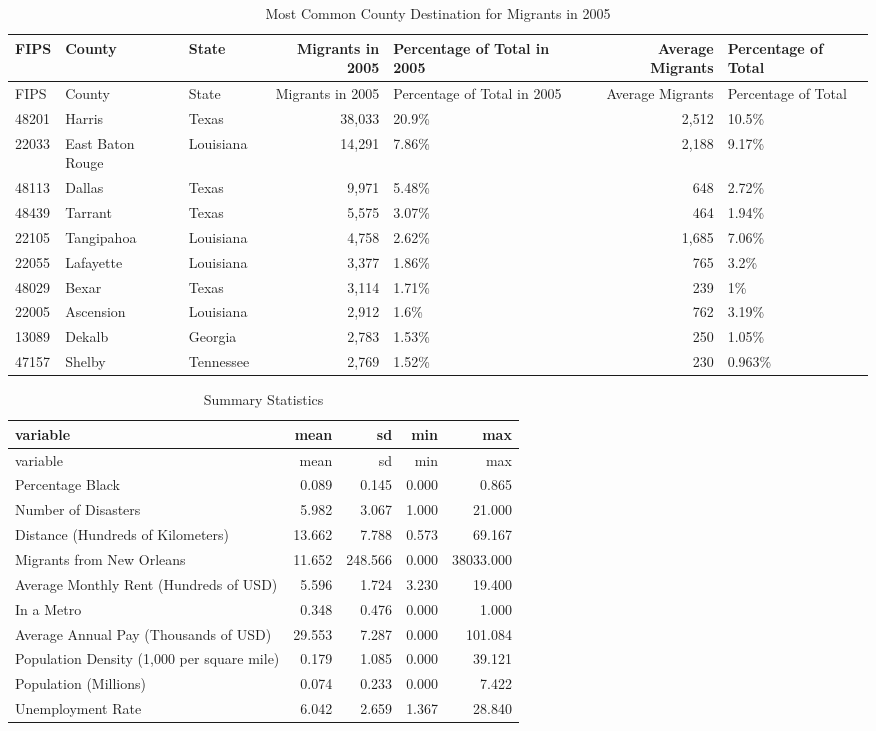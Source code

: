 \documentclass[]{article}
\begin{document}
\clearpage

\begin{longtable}[]{@{}lllrlrl@{}}
\caption{Most Common County Destination for Migrants in 2005
\label{tab:commondest}}\tabularnewline
\toprule
FIPS & County & State & Migrants in 2005 & Percentage of Total in 2005 &
Average Migrants & Percentage of Total\tabularnewline
\midrule
\endfirsthead
\toprule
FIPS & County & State & Migrants in 2005 & Percentage of Total in 2005 &
Average Migrants & Percentage of Total\tabularnewline
\midrule
\endhead
48201 & Harris & Texas & 38,033 & 20.9\% & 2,512 & 10.5\%\tabularnewline
22033 & East Baton Rouge & Louisiana & 14,291 & 7.86\% & 2,188 &
9.17\%\tabularnewline
48113 & Dallas & Texas & 9,971 & 5.48\% & 648 & 2.72\%\tabularnewline
48439 & Tarrant & Texas & 5,575 & 3.07\% & 464 & 1.94\%\tabularnewline
22105 & Tangipahoa & Louisiana & 4,758 & 2.62\% & 1,685 &
7.06\%\tabularnewline
22055 & Lafayette & Louisiana & 3,377 & 1.86\% & 765 &
3.2\%\tabularnewline
48029 & Bexar & Texas & 3,114 & 1.71\% & 239 & 1\%\tabularnewline
22005 & Ascension & Louisiana & 2,912 & 1.6\% & 762 &
3.19\%\tabularnewline
13089 & Dekalb & Georgia & 2,783 & 1.53\% & 250 & 1.05\%\tabularnewline
47157 & Shelby & Tennessee & 2,769 & 1.52\% & 230 &
0.963\%\tabularnewline
\bottomrule
\end{longtable}

\clearpage

\begin{longtable}[]{@{}lrrrr@{}}
\caption{Summary Statistics \label{tab:sumstats}}\tabularnewline
\toprule
variable & mean & sd & min & max\tabularnewline
\midrule
\endfirsthead
\toprule
variable & mean & sd & min & max\tabularnewline
\midrule
\endhead
Percentage Black & 0.089 & 0.145 & 0.000 & 0.865\tabularnewline
Number of Disasters & 5.982 & 3.067 & 1.000 & 21.000\tabularnewline
Distance (Hundreds of Kilometers) & 13.662 & 7.788 & 0.573 &
69.167\tabularnewline
Migrants from New Orleans & 11.652 & 248.566 & 0.000 &
38033.000\tabularnewline
Average Monthly Rent (Hundreds of USD) & 5.596 & 1.724 & 3.230 &
19.400\tabularnewline
In a Metro & 0.348 & 0.476 & 0.000 & 1.000\tabularnewline
Average Annual Pay (Thousands of USD) & 29.553 & 7.287 & 0.000 &
101.084\tabularnewline
Population Density (1,000 per square mile) & 0.179 & 1.085 & 0.000 &
39.121\tabularnewline
Population (Millions) & 0.074 & 0.233 & 0.000 & 7.422\tabularnewline
Unemployment Rate & 6.042 & 2.659 & 1.367 & 28.840\tabularnewline
\bottomrule
\end{longtable}
\end{document}
